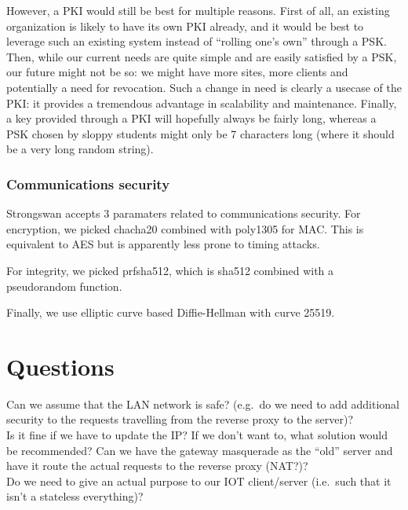 \documentclass[paper=a4, fontsize=11pt]{scrartcl}
\begin{document}
However, a PKI would still be best for multiple reasons.
First of all, an existing organization is likely to have its own PKI already,
and it would be best to leverage such an existing system instead of ``rolling
one's own'' through a PSK\@.
Then, while our current needs are quite simple and are easily satisfied by a
PSK, our future might not be so: we might have more sites, more clients and
potentially a need for revocation.
Such a change in need is clearly a usecase of the PKI\@: it provides a tremendous
advantage in scalability and maintenance.
Finally, a key provided through a PKI will hopefully always be fairly long,
whereas a PSK chosen by sloppy students might only be 7 characters long (where
it should be a very long random string).

\subsubsection{Communications security}

Strongswan accepts 3 paramaters related to communications security.
For encryption, we picked chacha20 combined with poly1305 for MAC\@.
This is equivalent to AES but is apparently less prone to timing attacks.

For integrity, we picked prfsha512, which is sha512 combined with a pseudorandom
function.

Finally, we use elliptic curve based Diffie-Hellman with curve 25519.

\section{Questions}

Can we assume that the LAN network is safe? (e.g.\ do we need to add additional
security to the requests travelling from the reverse proxy to the server)?\\

Is it fine if we have to update the IP\@?
If we don't want to, what solution would be recommended? Can we have the
gateway masquerade as the ``old'' server and have it route the actual requests to
the reverse proxy (NAT?)?\\

Do we need to give an actual purpose to our IOT client/server (i.e.\ such that
it isn't a stateless everything)?
\end{document}

